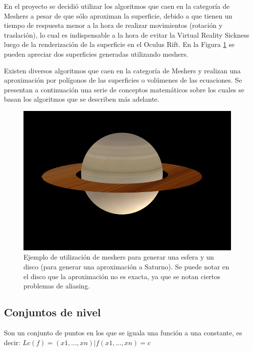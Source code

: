 \documentclass[12pt]{article}
\begin{document}
En el proyecto se decidió utilizar los algoritmos que caen en la categoría de Meshers\cite{mykola1}\cite{mykola2} a pesar de que sólo aproximan la superficie, debido a que tienen un tiempo de respuesta menor a la hora de realizar movimientos (rotación y traslación), lo cual es indispensable a la hora de evitar la Virtual Reality Sickness luego de la renderización de la superficie en el Oculus Rift. En la Figura \ref{saturno} se pueden apreciar dos superficies generadas utilizando meshers.

Existen diversos algoritmos que caen en la categoría de Meshers y realizan una aproximación por polígonos de las superficies o volúmenes de las ecuaciones. Se presentan a continuación una serie de conceptos matemáticos sobre los cuales se basan los algoritmos que se describen más adelante.
\begin{figure}[h]
\includegraphics[width=\textwidth]{saturno.png}
\caption{Ejemplo de utilización de meshers para generar una esfera y un disco (para generar una aproximación a Saturno). Se puede notar en el disco que la aproximación no es exacta, ya que se notan ciertos problemas de aliasing.}
\label{saturno}
\end{figure}
\clearpage
\subsection{Conjuntos de nivel}
Son un conjunto de puntos en los que se iguala una función a una constante, es decir:
$Lc(f) = {(x1,...,xn) | f(x1,...,xn)  = c}$ \cite{implicitas}
\end{document}
